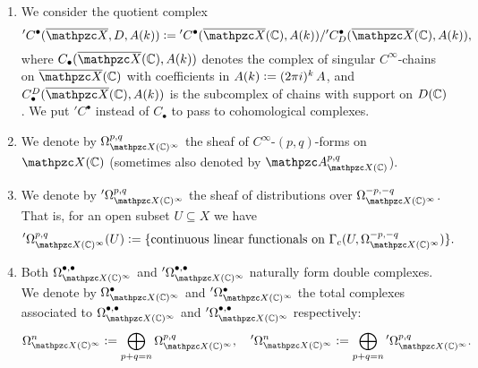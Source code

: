 \begin{enumerate}
\item We consider the quotient complex
  \[ {}' C^\bullet (\overline{\mathcal{X}}, D, A (k)) \dfn
    {}' C^\bullet (\overline{\mathcal{X}} (\CC), A (k)) /
    {}' C^\bullet_D (\overline{\mathcal{X}} (\CC), A (k)), \]
  where $C_\bullet (\overline{\mathcal{X}} (\CC), A (k))$ denotes the complex of
  singular $C^\infty$-chains on $\overline{\mathcal{X}} (\CC)$ with coefficients
  in $A (k) \mathrel{\mathop:}= (2\pi i)^k\,A$, and
  $C_\bullet^D (\overline{\mathcal{X}} (\CC), A (k))$ is the subcomplex of
  chains with support on $D (\mathbb{C})$. We put ${}' C^\bullet$ instead of
  $C_\bullet$ to pass to cohomological complexes.

\item We denote by $\Omega^{p,q}_{\mathcal{X} (\CC)^\infty}$ the sheaf of
  $C^\infty$-$(p,q)$-forms on $\mathcal{X} (\CC)$ (sometimes also denoted by
  $\mathcal{A}^{p,q}_{\mathcal{X} (\CC)}$).

\item We denote by ${}' \Omega^{p,q}_{\mathcal{X} (\CC)^\infty}$ the sheaf of
  distributions over $\Omega^{-p,-q}_{\mathcal{X} (\CC)^\infty}$. That is, for
  an open subset $U \subseteq X$ we have
  \[ {}' \Omega^{p,q}_{\mathcal{X} (\CC)^\infty} (U) \dfn
    \{ \text{continuous linear functionals on }
    \Gamma_c (U, \Omega^{-p,-q}_{\mathcal{X} (\CC)^\infty}) \}. \]

\item Both $\Omega^{\bullet,\bullet}_{\mathcal{X} (\CC)^\infty}$ and
  ${}' \Omega^{\bullet,\bullet}_{\mathcal{X} (\CC)^\infty}$ naturally form
  double complexes. We denote by $\Omega^\bullet_{\mathcal{X} (\CC)^\infty}$ and
  ${}' \Omega^\bullet_{\mathcal{X} (\CC)^\infty}$ the total complexes associated
  to $\Omega^{\bullet,\bullet}_{\mathcal{X} (\CC)^\infty}$ and
  ${}' \Omega^{\bullet,\bullet}_{\mathcal{X} (\CC)^\infty}$ respectively:
  \[ \Omega^n_{\mathcal{X} (\CC)^\infty} \dfn
    \bigoplus_{p+q=n} \Omega^{p,q}_{\mathcal{X} (\CC)^\infty},
    \quad
    {}' \Omega^n_{\mathcal{X} (\CC)^\infty} \dfn
    \bigoplus_{p+q=n} {}' \Omega^{p,q}_{\mathcal{X} (\CC)^\infty}. \]


\end{enumerate}
